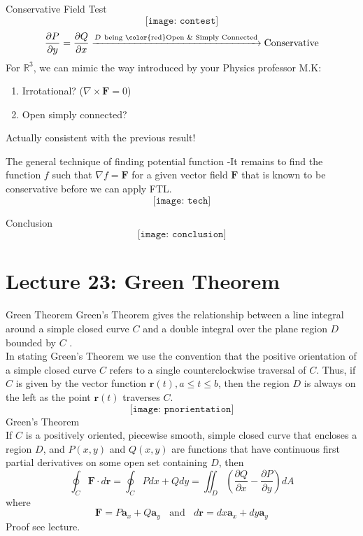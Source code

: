 \documentclass[10pt]{beamer}
\begin{document}
\begin{frame}[allowframebreaks]{Conservative Field Test}
$$\texttt{[image: contest]}$$
$$\dfrac{\partial P}{\partial y} = \dfrac{\partial Q}{\partial x} \xrightarrow{D ~\text{being {\color{red}Open \& Simply Connected}}} {\text{Conservative}}$$
For $\mathbb{R}^3$, we can mimic the way introduced by your Physics professor M.K:
\begin{enumerate}
	\item Irrotational? ($\nabla\times \mathbf{F} = 0$)
	\item Open simply connected?
\end{enumerate} 
Actually consistent with the previous result!
\end{frame}


\begin{frame}[allowframebreaks]{The general technique of finding potential function}
-It remains to find the function $f$ such that $\nabla f = \mathbf{F}$ for a given vector field $\mathbf{F}$
	that is known to be conservative before we can apply FTL.
$$\texttt{[image: tech]}$$

\end{frame}

\begin{frame}[allowframebreaks]{Conclusion}
$$\texttt{[image: conclusion]}$$
\end{frame}



\section{Lecture 23: Green Theorem}
\begin{frame}[allowframebreaks]{Green Theorem}
Green's Theorem gives the relationship between a line integral around a simple closed curve $C$ and a double integral over the plane region $D$ bounded by $C$ .\\
In stating Green's
Theorem we use the convention that the {\color{red}positive orientation} of a simple closed curve $C$
refers to a single {\color{blue}counterclockwise} traversal of $C$. Thus, if $C$ is given by the vector function $\mathbf{r}(t), a\leq t\leq b$, then the region $D$ is always on the left as the point $\mathbf{r}(t)$ traverses $C$.
$$\texttt{[image: pnorientation]}$$
$$$$
{\color{blue}Green's Theorem}\\
If $C$ is a positively oriented, piecewise smooth, simple
closed curve that encloses a region $D$, and $P(x, y)$ and $Q(x, y)$ are functions that
have continuous first partial derivatives on some open set containing $D$, then
$$\oint_C\mathbf{F}\cdot d\mathbf{r} = \oint_C Pdx + Qdy = \iint_D\left(\dfrac{\partial Q}{\partial x} - \dfrac{\partial P}{\partial y}\right)dA$$
where $$\mathbf{F} = P\mathbf{a}_x + Q\mathbf{a}_y~~~~\text{and}~~~~d\mathbf{r} = dx\mathbf{a}_x + dy\mathbf{a}_y$$
Proof see lecture.
\end{frame}
\end{document}
